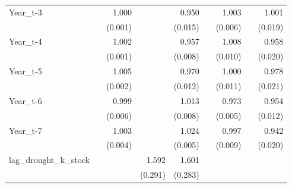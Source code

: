 \begin{table}[htbp]
\begin{tabular}{l*{8}{D{.}{.}{-1}}}
Year\_t-3    &                     &       1.000         &                     &       0.950\sym{***}&                     &       1.003         &                     &       1.001         \\
            &                     &     (0.001)         &                     &     (0.015)         &                     &     (0.006)         &                     &     (0.019)         \\
Year\_t-4    &                     &       1.002\sym{*}  &                     &       0.957\sym{***}&                     &       1.008         &                     &       0.958\sym{**} \\
            &                     &     (0.001)         &                     &     (0.008)         &                     &     (0.010)         &                     &     (0.020)         \\
Year\_t-5    &                     &       1.005\sym{**} &                     &       0.970\sym{**} &                     &       1.000         &                     &       0.978         \\
            &                     &     (0.002)         &                     &     (0.012)         &                     &     (0.011)         &                     &     (0.021)         \\
Year\_t-6    &                     &       0.999         &                     &       1.013         &                     &       0.973\sym{***}&                     &       0.954\sym{***}\\
            &                     &     (0.006)         &                     &     (0.008)         &                     &     (0.005)         &                     &     (0.012)         \\
Year\_t-7    &                     &       1.003         &                     &       1.024\sym{***}&                     &       0.997         &                     &       0.942\sym{***}\\
            &                     &     (0.004)         &                     &     (0.005)         &                     &     (0.009)         &                     &     (0.020)         \\
lag\_drought\_k\_stock&                     &                     &       1.592\sym{**} &       1.601\sym{***}&                     &                     &                     &                     \\
            &                     &                     &     (0.291)         &     (0.283)         &                     &                     &                     &                     \\

\end{tabular}
\end{table}
